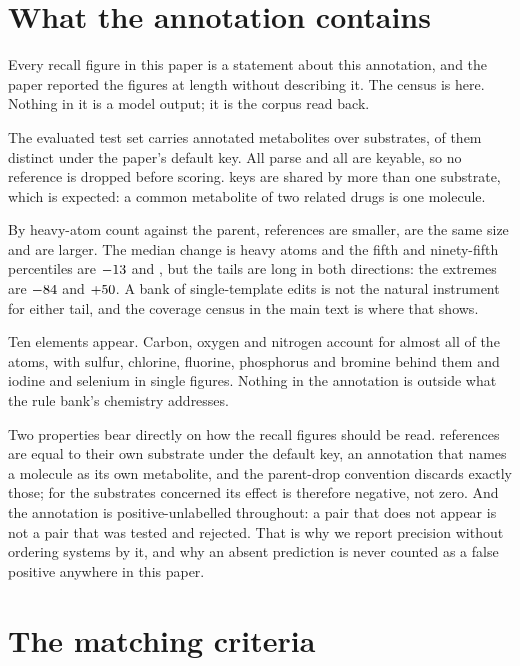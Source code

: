 \documentclass[journal=jcisd8,manuscript=suppinfo,layout=onecolumn]{achemso}
\begin{document}
\section{What the annotation contains}
\label{sec:si-annotation}

Every recall figure in this paper is a statement about this annotation, and the paper reported the
figures at length without describing it. The census is here. Nothing in it is a model output; it
is the corpus read back.

The evaluated test set carries \numRefauditReferences{} annotated metabolites over
\numRefauditSubstrates{} substrates, \numRefauditDistinct{} of them distinct under the paper's
default key. All \numRefauditReferences{} parse and all are keyable, so no reference is dropped
before scoring. \numRefauditShared{} keys are shared by more than one substrate, which is expected:
a common metabolite of two related drugs is one molecule.

By heavy-atom count against the parent, \numRefauditSmaller{} references are smaller,
\numRefauditSame{} are the same size and \numRefauditLarger{} are larger. The median change is
\numRefauditDeltamedian{} heavy atoms and the fifth and ninety-fifth percentiles are
$-13$ and \numRefauditDeltahi{}, but the tails are long in both directions: the
extremes are $-84$ and $+50{}$. A bank of single-template edits
is not the natural instrument for either tail, and the coverage census in the main text is where
that shows.

Ten elements appear. Carbon, oxygen and nitrogen account for almost all of the atoms, with
sulfur, chlorine, fluorine, phosphorus and bromine behind them and iodine and selenium in single
figures. Nothing in the annotation is outside what the rule bank's chemistry addresses.

Two properties bear directly on how the recall figures should be read.
\numRefauditSelfref{} references are equal to their own substrate under the default key, an
annotation that names a molecule as its own metabolite, and the parent-drop convention
discards exactly those; for the substrates concerned its effect is therefore negative,
not zero. And the annotation is positive-unlabelled throughout: a pair that
does not appear is not a pair that was tested and rejected. That is why we report precision without
ordering systems by it, and why an absent prediction is never counted as a false positive
anywhere in this paper.

\section{The matching criteria}
\label{sec:si-criteria}
\end{document}
